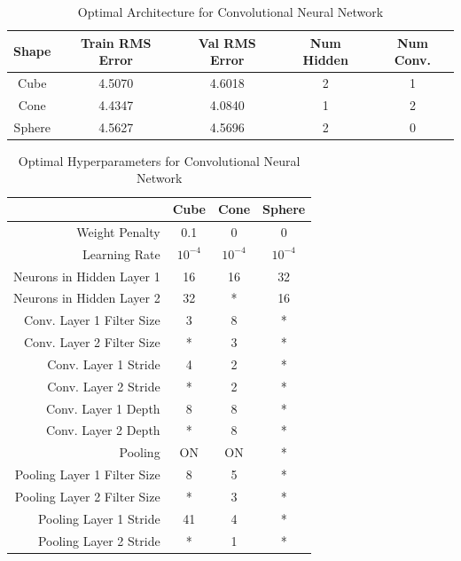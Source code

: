 \documentclass[journal]{IEEEtran}
\begin{document}
\begin{table}
	\caption{Optimal Architecture for Convolutional Neural Network}
	\label{CNN_Perf}
\begin{tabular}{|c|c|c|c|c|}
	\hline
	Shape & Train RMS Error & Val RMS Error & Num Hidden & Num Conv. \\
	\hline
	Cube & 4.5070 & 4.6018 & 2 & 1  \\
	Cone & 4.4347 & 4.0840 & 1 & 2\\
	Sphere &4.5627 & 4.5696  & 2 & 0\\
	\hline
\end{tabular}

\end{table}


\begin{table}
	\caption{Optimal Hyperparameters for Convolutional Neural Network}
	\label{CNN_Params}
	\begin{tabular}{|r|c|c|c|}
		\hline
     	&\multicolumn{1}{|c|}{Cube} & \multicolumn{1}{|c|}{Cone} &
     	\multicolumn{1}{|c|}{Sphere}\\
     	\hline
     	Weight Penalty  & 0.1 & 0 &0\\
     	\hline
     	Learning Rate & $10^{-4}$ & $10^{-4}$ & $10^{-4}$\\
     	\hline
     	Neurons in Hidden Layer 1  & 16 & 16  &32\\
		\hline
		Neurons in Hidden Layer 2  & 32 & * &16\\
		\hline
		Conv. Layer 1 Filter Size  & 3 & 8 &*\\
		\hline
		Conv. Layer 2 Filter Size  & * & 3 &*\\
		\hline
		Conv. Layer 1 Stride  & 4 & 2 &*\\
		\hline
		Conv. Layer 2 Stride  & * & 2 &*\\
		\hline
		Conv. Layer 1 Depth  & 8 & 8 &*\\
		\hline
		Conv. Layer 2 Depth  & * & 8 &*\\
		\hline
		Pooling  & ON & ON & *\\
		\hline
		Pooling Layer 1 Filter Size  & 8 & 5 &*\\
		\hline
		Pooling Layer 2 Filter Size  & * & 3 &*\\
		\hline
		Pooling Layer 1 Stride & 41 & 4 &*\\
		\hline
		Pooling Layer 2 Stride  & * & 1 &*\\
		

		\hline
	\end{tabular}
	
\end{table}
\end{document}
